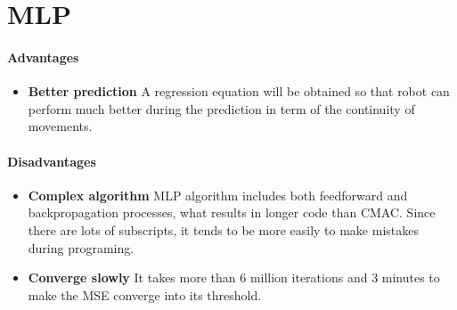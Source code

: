\documentclass[
11pt, %
a4paper, %
oneside, %
headinclude%
BCOR3mm, %
]{scrartcl}
\title{\normalfont\spacedallcaps{comparison between MLP $\&$ CMAC}} %
\author{\spacedlowsmallcaps{Group A }} %
\date{Tianming Qiu,\quad Qiuhai Guo} %
\begin{document}

\renewcommand{\sectionmark}[1]{\markright{\spacedlowsmallcaps{#1}}} %
\lehead{\mbox{\llap{\small\thepage\kern1em\color{halfgray} \vline}\color{halfgray}\hspace{0.5em}\rightmark\hfil}} %


\maketitle %


\section{MLP}

\paragraph{Advantages}
\begin{itemize}[noitemsep]
\item \textbf{Better prediction}
A regression equation will be obtained so that robot can perform much better during the prediction in term of the continuity of movements.
\end{itemize} 
\paragraph{Disadvantages}
\begin{itemize}[noitemsep]
\item \textbf{Complex algorithm}
MLP algorithm includes both feedforward and backpropagation processes, what results in longer code than CMAC. 
Since there are lots of subscripts, it tends to be more easily to make mistakes during programing.

\item \textbf{Converge slowly}
It takes more than 6 million iterations and 3 minutes to make the MSE converge into its threshold.
\end{itemize} 
 
\end{document}
